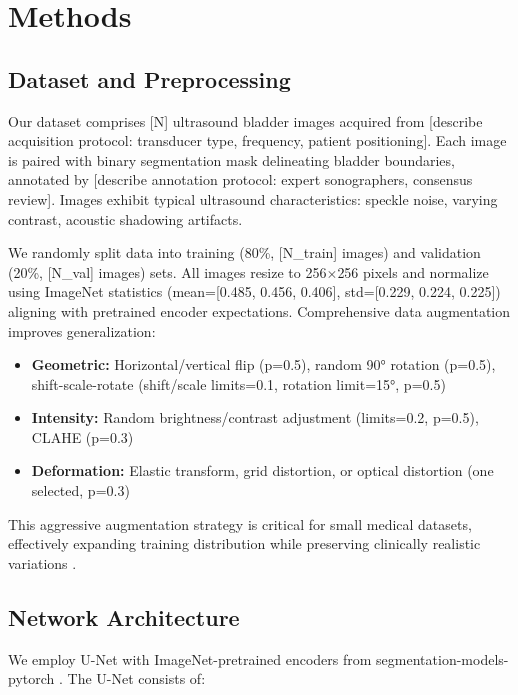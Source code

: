\documentclass{article}
\begin{document}
\section{Methods}
\label{sec:methods}

\subsection{Dataset and Preprocessing}

Our dataset comprises [N] ultrasound bladder images acquired from [describe acquisition protocol: transducer type, frequency, patient positioning]. Each image is paired with binary segmentation mask delineating bladder boundaries, annotated by [describe annotation protocol: expert sonographers, consensus review]. Images exhibit typical ultrasound characteristics: speckle noise, varying contrast, acoustic shadowing artifacts.

We randomly split data into training (80\%, [N\_train] images) and validation (20\%, [N\_val] images) sets. All images resize to 256$\times$256 pixels and normalize using ImageNet statistics (mean=[0.485, 0.456, 0.406], std=[0.229, 0.224, 0.225]) aligning with pretrained encoder expectations. Comprehensive data augmentation improves generalization:

\begin{itemize}
    \item \textbf{Geometric:} Horizontal/vertical flip (p=0.5), random 90° rotation (p=0.5), shift-scale-rotate (shift/scale limits=0.1, rotation limit=15°, p=0.5)
    \item \textbf{Intensity:} Random brightness/contrast adjustment (limits=0.2, p=0.5), CLAHE (p=0.3)
    \item \textbf{Deformation:} Elastic transform, grid distortion, or optical distortion (one selected, p=0.3)
\end{itemize}

This aggressive augmentation strategy is critical for small medical datasets, effectively expanding training distribution while preserving clinically realistic variations \cite{perez2017effectiveness}.

\subsection{Network Architecture}

We employ U-Net \cite{ronneberger2015unet} with ImageNet-pretrained encoders from segmentation-models-pytorch \cite{yakubovskiy2020segmentation}. The U-Net consists of:
\end{document}
